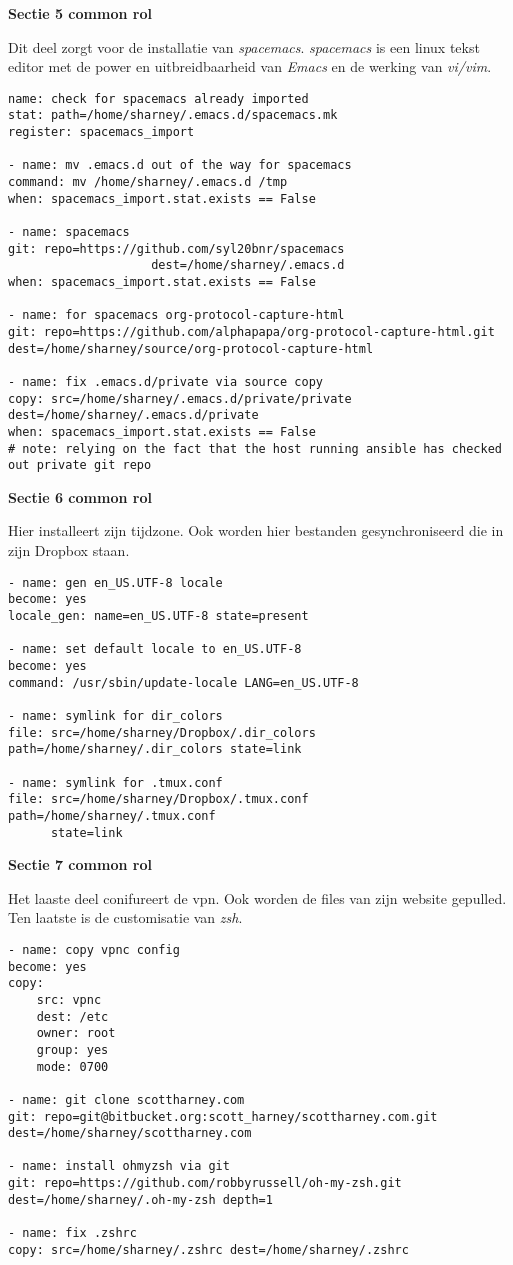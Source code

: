 \newpage
\textbf{Sectie 5 common rol}

Dit deel zorgt voor de installatie van \textit{spacemacs}. \textit{spacemacs} is een linux tekst editor met de power en uitbreidbaarheid van \textit{Emacs} en de werking van \textit{vi/vim}.
\begin{lstlisting}[basicstyle=\small]
 name: check for spacemacs already imported
stat: path=/home/sharney/.emacs.d/spacemacs.mk
register: spacemacs_import

- name: mv .emacs.d out of the way for spacemacs
command: mv /home/sharney/.emacs.d /tmp
when: spacemacs_import.stat.exists == False

- name: spacemacs
git: repo=https://github.com/syl20bnr/spacemacs 
					dest=/home/sharney/.emacs.d 
when: spacemacs_import.stat.exists == False

- name: for spacemacs org-protocol-capture-html
git: repo=https://github.com/alphapapa/org-protocol-capture-html.git dest=/home/sharney/source/org-protocol-capture-html

- name: fix .emacs.d/private via source copy
copy: src=/home/sharney/.emacs.d/private/private 
dest=/home/sharney/.emacs.d/private
when: spacemacs_import.stat.exists == False
# note: relying on the fact that the host running ansible has checked out private git repo
\end{lstlisting}

\textbf{Sectie 6 common rol}

Hier installeert \autocite{commonscottharney} zijn tijdzone. Ook worden hier bestanden gesynchroniseerd die in zijn Dropbox staan.
\begin{lstlisting}[basicstyle=\small]
- name: gen en_US.UTF-8 locale
become: yes
locale_gen: name=en_US.UTF-8 state=present

- name: set default locale to en_US.UTF-8
become: yes
command: /usr/sbin/update-locale LANG=en_US.UTF-8

- name: symlink for dir_colors
file: src=/home/sharney/Dropbox/.dir_colors 
path=/home/sharney/.dir_colors state=link

- name: symlink for .tmux.conf
file: src=/home/sharney/Dropbox/.tmux.conf path=/home/sharney/.tmux.conf 
	  state=link
\end{lstlisting}

\newpage
\textbf{Sectie 7 common rol}

Het laaste deel conifureert de vpn. Ook worden de files van zijn website gepulled. Ten laatste is de customisatie van \textit{zsh}.
\begin{lstlisting}[basicstyle=\small]
- name: copy vpnc config
become: yes
copy:
    src: vpnc
    dest: /etc
    owner: root
    group: yes
    mode: 0700 

- name: git clone scottharney.com
git: repo=git@bitbucket.org:scott_harney/scottharney.com.git
dest=/home/sharney/scottharney.com

- name: install ohmyzsh via git
git: repo=https://github.com/robbyrussell/oh-my-zsh.git  
dest=/home/sharney/.oh-my-zsh depth=1 

- name: fix .zshrc
copy: src=/home/sharney/.zshrc dest=/home/sharney/.zshrc
\end{lstlisting}

